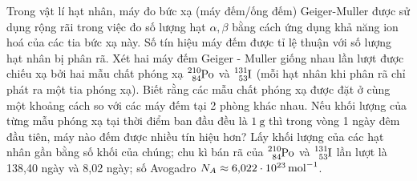 \begin{ex}
	Trong vật lí hạt nhân, máy đo bức xạ (máy đếm/ống đếm) Geiger-Muller được sử dụng rộng rãi trong việc đo số lượng hạt $\alpha, \beta$ bằng cách ứng dụng khả năng ion hoá của các tia bức xạ này. Số tín hiệu máy đếm được tỉ lệ thuận với số lượng hạt nhân bị phân rã. Xét hai máy đếm Geiger - Muller giống nhau lần lượt được chiếu xạ bởi hai mẫu chất phóng xạ $\ce{_{84}^{210}Po}$ và $\ce{_{53}^{131}I}$ (mỗi hạt nhân khi phân rã chỉ phát ra một tia phóng xạ). Biết rằng các mẫu chất phóng xạ được đặt ở cùng một khoảng cách so với các máy đếm tại 2 phòng khác nhau. Nếu khối lượng của từng mẫu phóng xạ tại thời điểm ban đầu đều là $\SI{1}{\gram}$ thì trong vòng 1 ngày đêm đầu tiên, máy nào đếm được nhiều tín hiệu hơn? Lấy khối lượng của các hạt nhân gần bằng số khối của chúng; chu kì bán rã của $\ce{_{84}^{210}Po}$ và $\ce{_{53}^{131}I}$ lần lượt là 138,40 ngày và 8,02 ngày; số Avogadro $N_{A} \approx \SI{6.022E23}{\mole^{-1}}$.	
\end{ex}
